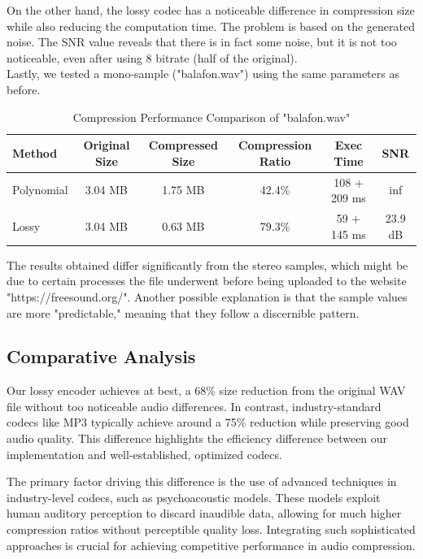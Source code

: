 \documentclass[a4paper,14pt]{article}
\begin{document}
On the other hand, the lossy codec has a noticeable difference in compression size while also reducing the computation time. The problem is based on the generated noise. The SNR value reveals that there is in fact some noise, but it is not too noticeable, even after using 8 bitrate (half of the original). \\



Lastly, we tested a mono-sample ("balafon.wav") using the same parameters as before.
\begin{table}[H]
\centering
\begin{tabular}{|l|c|c|c|c|c|}
\hline
\textbf{Method} & \textbf{Original Size} & \textbf{Compressed Size} & \textbf{Compression Ratio} & \textbf{Exec Time} & \textbf{SNR}\\
\hline
Polynomial & 3.04 MB & 1.75 MB & 42.4\% & 108 + 209 ms & inf\\ 
Lossy & 3.04 MB & 0.63 MB & 79.3\% & 59 + 145 ms & 23.9 dB\\
\hline
\end{tabular}
\caption{Compression Performance Comparison of "balafon.wav"}
\end{table}

The results obtained differ significantly from the stereo samples, which might be due to certain processes the file underwent before being uploaded to the website "https://freesound.org/". Another possible explanation is that the sample values are more "predictable," meaning that they follow a discernible pattern.


\subsection{Comparative Analysis}
Our lossy encoder achieves at best, a 68\% size reduction from the original WAV file without too noticeable audio differences. In contrast, industry-standard codecs like MP3 typically achieve around a 75\% reduction while preserving good audio quality. This difference highlights the efficiency difference between our implementation and well-established, optimized codecs. 

The primary factor driving this difference is the use of advanced techniques in industry-level codecs, such as psychoacoustic models. These models exploit human auditory perception to discard inaudible data, allowing for much higher compression ratios without perceptible quality loss. Integrating such sophisticated approaches is crucial for achieving competitive performance in audio compression.
\end{document}
